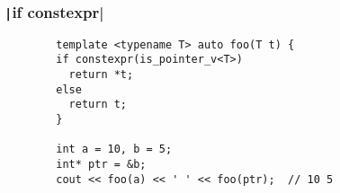 \documentclass[C++.tex]{subfiles}
\begin{document}
\begin{frame}[fragile]
	\frametitle{\texttt|if constexpr|}
	\begin{verbatim}
		template <typename T> auto foo(T t) {
		if constexpr(is_pointer_v<T>)
		  return *t;
		else
		  return t;
		}

		int a = 10, b = 5;
		int* ptr = &b;
		cout << foo(a) << ' ' << foo(ptr);  // 10 5
	\end{verbatim}


\end{frame}
\end{document}
